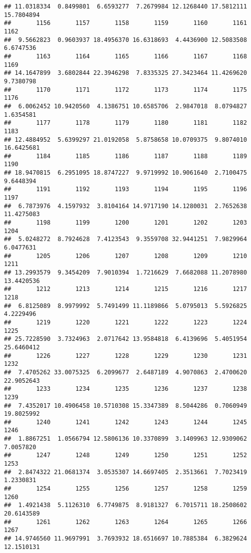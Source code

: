 \documentclass[
]{article}
\begin{document}
\begin{verbatim}
## 11.0318334  0.8499801  6.6593277  7.2679984 12.1268440 17.5812111 15.7804894 
##       1156       1157       1158       1159       1160       1161       1162 
##  9.5662823  0.9603937 18.4956370 16.6318693  4.4436900 12.5083508  6.6747536 
##       1163       1164       1165       1166       1167       1168       1169 
## 14.1647899  3.6802844 22.3946298  7.8335325 27.3423464 11.4269620  9.7380798 
##       1170       1171       1172       1173       1174       1175       1176 
##  6.0062452 10.9420560  4.1386751 10.6585706  2.9847018  8.0794827  1.6354581 
##       1177       1178       1179       1180       1181       1182       1183 
## 12.4884952  5.6399297 21.0192058  5.8758658 10.0709375  9.8074010 16.6425681 
##       1184       1185       1186       1187       1188       1189       1190 
## 18.9470815  6.2951095 18.8747227  9.9719992 10.9061640  2.7100475  9.6448394 
##       1191       1192       1193       1194       1195       1196       1197 
##  6.7873976  4.1597932  3.8104164 14.9717190 14.1280031  2.7652638 11.4275083 
##       1198       1199       1200       1201       1202       1203       1204 
##  5.0248272  8.7924628  7.4123543  9.3559708 32.9441251  7.9829964  6.0477631 
##       1205       1206       1207       1208       1209       1210       1211 
## 13.2993579  9.3454209  7.9010394  1.7216629  7.6682088 11.2078980 13.4420536 
##       1212       1213       1214       1215       1216       1217       1218 
##  6.8125089  8.9979992  5.7491499 11.1189866  5.0795013  5.5926825  4.2229496 
##       1219       1220       1221       1222       1223       1224       1225 
## 25.7228590  3.7324963  2.0717642 13.9584818  6.4139696  5.4051954 25.6460412 
##       1226       1227       1228       1229       1230       1231       1232 
##  7.4705262 33.0075325  6.2099677  2.6487189  4.9070863  2.4700620 22.9052643 
##       1233       1234       1235       1236       1237       1238       1239 
##  7.4352017 10.4906458 10.5710308 15.3347389  8.5044286  0.7060949 19.8025992 
##       1240       1241       1242       1243       1244       1245       1246 
##  1.8867251  1.0566794 12.5806136 10.3370899  3.1409963 12.9309062  7.0057820 
##       1247       1248       1249       1250       1251       1252       1253 
##  2.8474322 21.0681374  3.0535307 14.6697405  2.3513661  7.7023419  1.2330831 
##       1254       1255       1256       1257       1258       1259       1260 
##  1.4921438  5.1126310  6.7749875  8.9181327  6.7015711 18.2508602 20.6143589 
##       1261       1262       1263       1264       1265       1266       1267 
## 14.9746560 11.9697991  3.7693932 18.6516697 10.7885384  6.3829624 12.1510131 

\end{verbatim}
\end{document}
